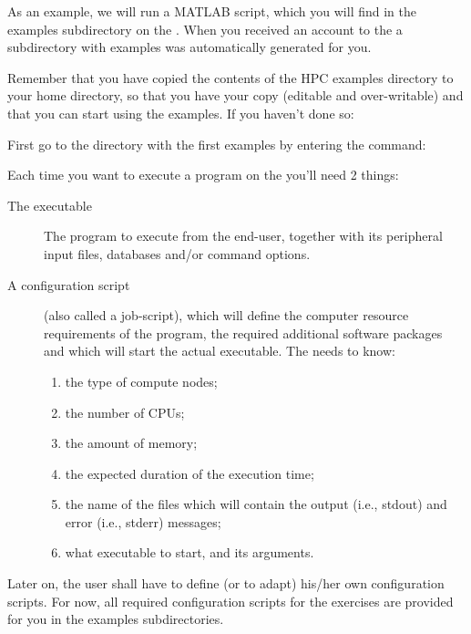 As an example, we will run a MATLAB script, which you will find in the examples
subdirectory on the \hpc. When you received an account to the \hpc a
subdirectory with examples was automatically generated for you.

Remember that you have copied the contents of the HPC examples directory to
your home directory, so that you have your  copy (editable
and over-writable) and that you can start using the examples. If you haven't
done so:

\begin{prompt}
\end{prompt}

First go to the directory with the first examples by entering the command:

\begin{prompt}
\end{prompt}

Each time you want to execute a program on the \hpc you'll need 2 things:

\begin{description}
  \item[The executable] The program to execute from the end-user, together with its peripheral input files, databases and/or command options.
  \item[A configuration script] (also called a job-script), which will define the computer resource requirements of the program, the required additional software packages and which will start the actual executable.  The \hpc needs to know:
    \begin{enumerate}
      \item  the type of compute nodes;
      \item  the number of CPUs;
      \item  the amount of memory;
      \item  the expected duration of the execution time;
      \item  the name of the files which will contain the output (i.e., stdout) and error (i.e., stderr) messages;
      \item  what executable to start, and its arguments.
    \end{enumerate}
\end{description}

Later on, the \hpc user shall have to define (or to adapt) his/her own
configuration scripts. For now, all required configuration scripts for the
exercises are provided for you in the examples subdirectories.

